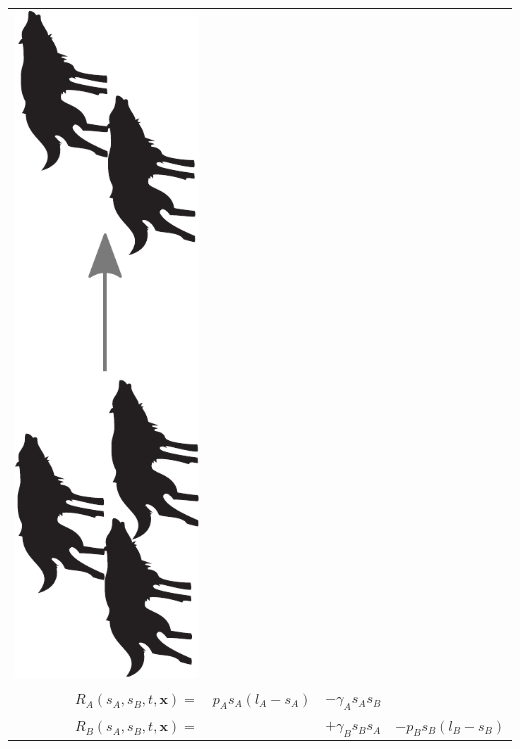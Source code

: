 \documentclass[12pt]{beamer}
\begin{document}
\begin{frame}
\begin{itemize}
\begin{tabular}{ r c c c }
      \includegraphics[scale=0.15,angle=-90,origin=c]{Bilder/lv_kill.pdf}
	  \\
	  \(
		R_A(s_A,s_B,t,\bm{x})=
	  \)
	  &
	  \(
		p_A s_A (l_A-s_A)
	  \)
	  &
	  \(
		- \gamma_A s_A s_B
	  \)
	  &
	  \\
	  \(
		R_B(s_A,s_B,t,\bm{x})=
	  \)
	  &
	  &
	  \(
		+ \gamma_B s_B s_A
	  \)
	  &
	  \(
		- p_B s_B (l_B-s_B)
	  \)
	  \\
      \end{tabular}


\end{itemize}
\end{frame}
\end{document}

